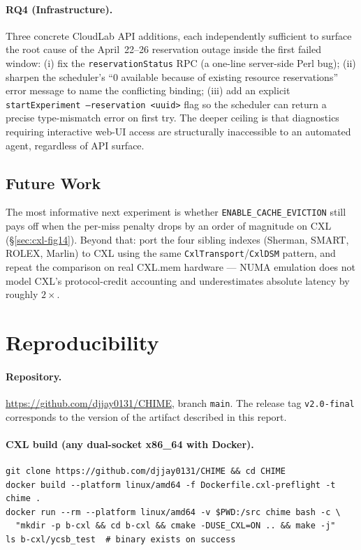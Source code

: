 \documentclass[11pt,a4paper]{article}
\begin{document}
\paragraph{RQ4 (Infrastructure).} Three concrete CloudLab API additions, each independently sufficient to surface the root cause of the April~22--26 reservation outage inside the first failed window: (i) fix the \texttt{reservationStatus} RPC (a one-line server-side Perl bug); (ii) sharpen the scheduler's ``0 available because of existing resource reservations'' error message to name the conflicting binding; (iii) add an explicit \texttt{startExperiment --reservation <uuid>} flag so the scheduler can return a precise type-mismatch error on first try. The deeper ceiling is that diagnostics requiring interactive web-UI access are structurally inaccessible to an automated agent, regardless of API surface.

\subsection{Future Work}

The most informative next experiment is whether \texttt{ENABLE\_CACHE\_EVICTION} still pays off when the per-miss penalty drops by an order of magnitude on CXL (\S\ref{sec:cxl-fig14}). Beyond that: port the four sibling indexes (Sherman, SMART, ROLEX, Marlin) to CXL using the same \texttt{CxlTransport}/\texttt{CxlDSM} pattern, and repeat the comparison on real CXL.mem hardware --- NUMA emulation does not model CXL's protocol-credit accounting and underestimates absolute latency by roughly $2\times$.




\appendix

\section{Reproducibility}
\label{app:repro}

\paragraph{Repository.} \url{https://github.com/djjay0131/CHIME}, branch \texttt{main}. The release tag \texttt{v2.0-final} corresponds to the version of the artifact described in this report.

\paragraph{CXL build (any dual-socket x86\_64 with Docker).}
\begin{lstlisting}
git clone https://github.com/djjay0131/CHIME && cd CHIME
docker build --platform linux/amd64 -f Dockerfile.cxl-preflight -t chime .
docker run --rm --platform linux/amd64 -v $PWD:/src chime bash -c \
  "mkdir -p b-cxl && cd b-cxl && cmake -DUSE_CXL=ON .. && make -j"
ls b-cxl/ycsb_test  # binary exists on success
\end{lstlisting}
\end{document}
